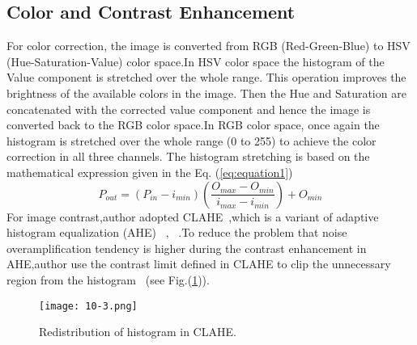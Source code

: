 \documentclass[10pt,twocolumn,letterpaper]{article}
\begin{document}
\subsection{Color and Contrast Enhancement}
For color correction, the image is converted from RGB (Red-Green-Blue) to HSV (Hue-Saturation-Value) color space.In HSV color space the histogram of the Value component is stretched over the whole range. This operation improves the brightness of the available colors in the image. Then the Hue and Saturation are concatenated with the corrected value component and hence the image is converted back to the RGB color space.In RGB color space, once again the histogram is
stretched over the whole range (0 to 255) to achieve the color correction in all three channels. The histogram stretching is based on the mathematical expression given in the Eq. (\ref{eq:equation1})
\begin{equation}
P_{out} = (P_{in}-i_{min})(\frac{O_{max}-O_{min}}{i_{max}-i_{min}})+O_{min}
\label{eq:equation1}
\end{equation}
For image contrast,author adopted CLAHE~\cite{Adaptive_1987_2},which is a variant of adaptive histogram equalization (AHE) ~\cite{Image_1974_3}, ~\cite{Image_1977_4}.To reduce the problem that noise overamplification tendency is higher during the contrast enhancement in AHE,author use the contrast limit defined in CLAHE to clip the unnecessary region from the histogram ~\cite{Contrast_1994_5}(see Fig.(\ref{fig:thirdpicture})).
\begin{figure}[htb]
\centering
\texttt{[image: 10-3.png]}
\caption{Redistribution of histogram in CLAHE.}
\label{fig:thirdpicture}
\end{figure}
\end{document}

